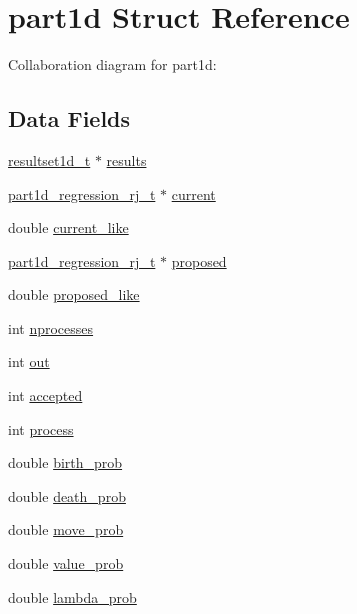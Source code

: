 \hypertarget{structpart1d}{}\section{part1d Struct Reference}
\label{structpart1d}


Collaboration diagram for part1d\+:
\subsection*{Data Fields}
\begin{DoxyCompactItemize}
\item 
\hyperlink{resultset1d_8h_ae2ef1c63a8e796e51d39d8b7c2cdfa72}{resultset1d\+\_\+t} $\ast$ \hyperlink{structpart1d_a11b93ee9eed232a8d71fc470e96bd21d}{results}
\item 
\hyperlink{part1d__regression__rj_8h_aa2f35f4fdfcc952190e95c0a9f50fd2f}{part1d\+\_\+regression\+\_\+rj\+\_\+t} $\ast$ \hyperlink{structpart1d_adaa79f60cbc59525faa8f33e5f451613}{current}
\item 
double \hyperlink{structpart1d_a76d098391e7a6a8f0575a695ff780fe5}{current\+\_\+like}
\item 
\hyperlink{part1d__regression__rj_8h_aa2f35f4fdfcc952190e95c0a9f50fd2f}{part1d\+\_\+regression\+\_\+rj\+\_\+t} $\ast$ \hyperlink{structpart1d_aea5862ff7193ba1ad85ce8e6337fa27c}{proposed}
\item 
double \hyperlink{structpart1d_a06b783dcb2ee38b655fe4436149fbd62}{proposed\+\_\+like}
\item 
int \hyperlink{structpart1d_a719eca19acb2bb75a4beb07fee91802a}{nprocesses}
\item 
int \hyperlink{structpart1d_a675c73d131631df6c702fc72ffbd8f0e}{out}
\item 
int \hyperlink{structpart1d_a837610d0363ea94ac1535788d9cc8b91}{accepted}
\item 
int \hyperlink{structpart1d_af8c16d340145531dd5395514ec97a064}{process}
\item 
double \hyperlink{structpart1d_af2cb7c8f0b1a14c4850c3f2a99f696e2}{birth\+\_\+prob}
\item 
double \hyperlink{structpart1d_a538591f7d53c2f21ab61a509fd743ae7}{death\+\_\+prob}
\item 
double \hyperlink{structpart1d_a271ac59decb44606da24c8b7301b9096}{move\+\_\+prob}
\item 
double \hyperlink{structpart1d_ad5ea1e509232c5cda8d492ad1f96b8cb}{value\+\_\+prob}
\item 
double \hyperlink{structpart1d_a5dc8a6d2217c23f6aff289b53bc1ca54}{lambda\+\_\+prob}

\end{DoxyCompactItemize}
